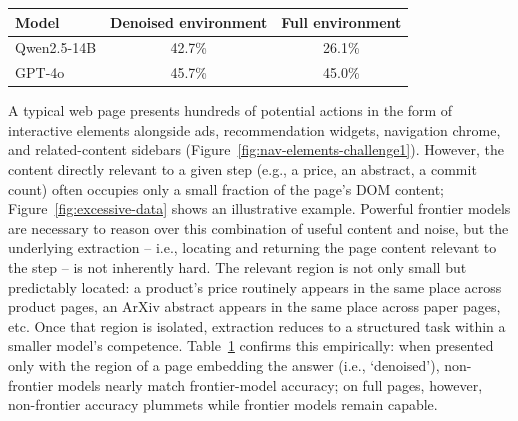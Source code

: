  \begin{table}[t]
    \centering
    \small
    \begin{tabular}{lcc}
        \toprule
        \textbf{Model} & \textbf{Denoised environment} & \textbf{Full environment} \\
        \midrule
        Qwen2.5-14B & 42.7\%  & 26.1\%  \\
        GPT-4o &  45.7\% & 45.0\% \\
        \bottomrule
    \end{tabular}
    \vspace{8pt}
        \label{t:accuracy-vs-noise}
\end{table}

A typical web page presents hundreds of potential actions in the form of interactive elements alongside ads, recommendation widgets, navigation chrome, and related-content sidebars (Figure~\ref{fig:nav-elements-challenge1}). However, the content directly relevant to a given step (e.g., a price, an abstract, a commit count) often occupies only a small fraction of the page's DOM content; Figure~\ref{fig:excessive-data} shows an illustrative example. Powerful frontier models are necessary to reason over this combination of useful content and noise, but the underlying extraction -- i.e., locating and returning the page content relevant to the step -- is not inherently hard. The relevant region is not only small but predictably located: a product's price routinely appears in the same place across product pages, an ArXiv abstract appears in the same place across paper pages, etc. Once that region is isolated, extraction reduces to a structured task within a smaller model's competence. 
Table~\ref{t:accuracy-vs-noise} confirms this empirically: when presented only with the region of a page embedding the answer (i.e., `denoised'), non-frontier models nearly match frontier-model accuracy; on full pages, however, non-frontier accuracy plummets while frontier models remain capable. 

